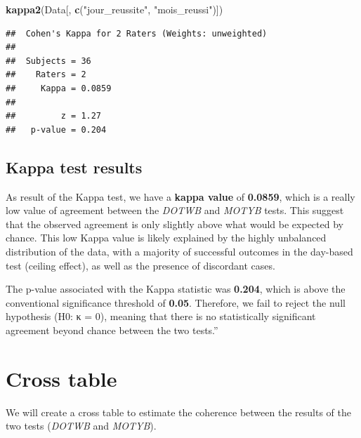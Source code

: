 \documentclass[
]{article}
\newenvironment{Shaded}{\begin{snugshade}}{\end{snugshade}}
\newcommand{\AttributeTok}[1]{\textcolor[rgb]{0.13,0.29,0.53}{#1}}
\newcommand{\FunctionTok}[1]{\textcolor[rgb]{0.13,0.29,0.53}{\textbf{#1}}}
\newcommand{\NormalTok}[1]{#1}
\newcommand{\SpecialCharTok}[1]{\textcolor[rgb]{0.81,0.36,0.00}{\textbf{#1}}}
\newcommand{\StringTok}[1]{\textcolor[rgb]{0.31,0.60,0.02}{#1}}
\begin{document}
\begin{Shaded}
\begin{Highlighting}[]
\FunctionTok{kappa2}\NormalTok{(Data[, }\FunctionTok{c}\NormalTok{(}\StringTok{"jour\_reussite"}\NormalTok{, }\StringTok{"mois\_reussi"}\NormalTok{)])}
\end{Highlighting}
\end{Shaded}

\begin{verbatim}
##  Cohen's Kappa for 2 Raters (Weights: unweighted)
## 
##  Subjects = 36 
##    Raters = 2 
##     Kappa = 0.0859 
## 
##         z = 1.27 
##   p-value = 0.204
\end{verbatim}

\subsection{Kappa test results}\label{kappa-test-results}

As result of the Kappa test, we have a \textbf{kappa value} of
\textbf{0.0859}, which is a really low value of agreement between the
\emph{DOTWB} and \emph{MOTYB} tests. This suggest that the observed
agreement is only slightly above what would be expected by chance. This
low Kappa value is likely explained by the highly unbalanced
distribution of the data, with a majority of successful outcomes in the
day-based test (ceiling effect), as well as the presence of discordant
cases.

The p-value associated with the Kappa statistic was \textbf{0.204},
which is above the conventional significance threshold of \textbf{0.05}.
Therefore, we fail to reject the null hypothesis (H0: κ = 0), meaning
that there is no statistically significant agreement beyond chance
between the two tests.''

\section{Cross table}\label{cross-table}

We will create a cross table to estimate the coherence between the
results of the two tests (\emph{DOTWB} and \emph{MOTYB}).

\begin{Shaded}
\end{Shaded}
\end{document}
